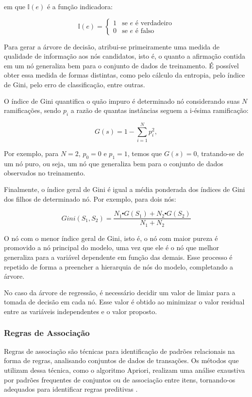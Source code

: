 em que $\mathbb{I}(e)$ é a função indicadora:

\begin{equation}
    \mathbb{I}(e) = \begin{cases} 
          1 & \text{se } e \text{ é verdadeiro} \\
          0 & \text{se } e \text{ é falso} 
       \end{cases}
    \end{equation}
    

Para gerar a árvore de decisão, atribui-se primeiramente uma medida de qualidade
de informação aos nós candidatos, isto é, o quanto a afirmação contida em um nó
generaliza bem para o conjunto de dados de treinamento. É possível obter essa
medida de formas distintas, como pelo cálculo da entropia, pelo índice de Gini,
pelo erro de classificação, entre outras.

O índice de Gini quantifica o
quão impuro é determinado nó considerando suas $N$ ramificações, sendo $p_i$
a razão de quantas instâncias seguem a i-ésima ramificação:

\begin{equation}
    G(s) = 1 - \sum_{i=1}^{N} p_{i}^{2},
\end{equation}

Por exemplo, para $N = 2$, $p_{0} = 0$ e $p_{1} = 1$, temos que $G(s) = 0$,
tratando-se de um nó puro, ou seja, um nó que generaliza bem para o conjunto de
dados observados no treinamento.

Finalmente, o índice geral de Gini é igual a média ponderada dos índices de Gini
dos filhos de determinado nó. Por exemplo, para dois nós:


\begin{equation}
    Gini(S_1, S_2) = \frac{N_1 \centerdot G(S_1) +  N_2 \centerdot G(S_2)}{N_1 + N_2}
\end{equation}

O nó com o menor índice geral de Gini, isto é, o nó com maior pureza é promovido
a nó principal do modelo, uma vez que ele é o nó que melhor generaliza para a
variável dependente em função das demais. Esse processo é repetido de forma a
preencher a hierarquia de nós do modelo, completando a árvore.

No caso da árvore de regressão, é necessário decidir um valor de limiar para a
tomada de decisão em cada nó. Esse valor é obtido ao minimizar o valor residual
entre as variáveis independentes e o valor proposto.

\subsubsection{Regras de Associação}
Regras de associação são técnicas para identificação de padrões relacionais
na forma de regras, analisando conjuntos de dados de transações. Os métodos que
utilizam dessa técnica, como o algoritmo Apriori, realizam uma análise exaustiva
por padrões frequentes de conjuntos ou de associação entre itens, tornando-os
adequados para identificar regras preditivas \cite{jannach2011recommender}.

